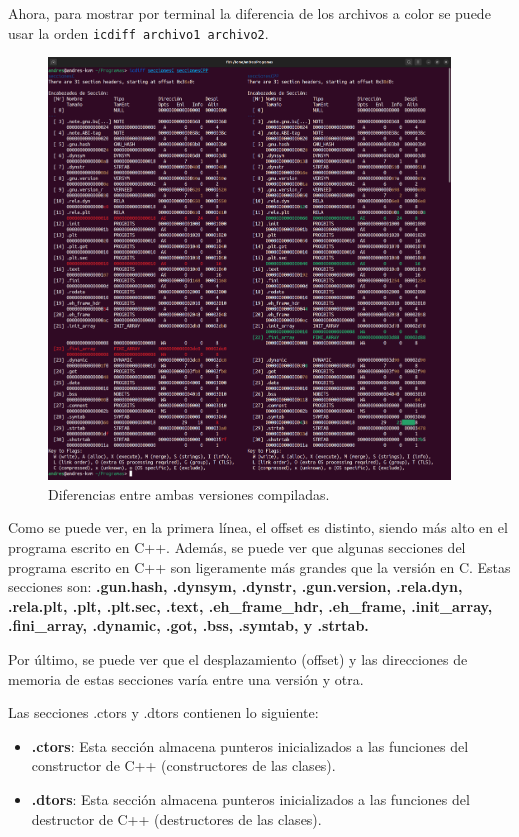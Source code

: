 \documentclass{article}
\begin{document}
Ahora, para mostrar por terminal la diferencia de los archivos a color se puede usar la orden \verb|icdiff archivo1 archivo2|.

\begin{figure}[H]
    \centering
    \includegraphics[width=0.95\textwidth]{imagenes/icdiff/mergedicdiff.png}
    \caption{Diferencias entre ambas versiones compiladas.}
\end{figure}

Como se puede ver, en la primera línea, el offset es distinto, siendo más alto en el programa escrito en C++. Además, se puede ver que algunas secciones del programa escrito en C++ son ligeramente más grandes que la versión en C. Estas secciones son: \textbf{.gun.hash, .dynsym, .dynstr, .gun.version, .rela.dyn, .rela.plt, .plt, .plt.sec, .text, .eh\_frame\_hdr, .eh\_frame, .init\_array, .fini\_array, .dynamic, .got, .bss, .symtab, y .strtab.}

\bigskip

Por último, se puede ver que el desplazamiento (offset) y las direcciones de memoria de estas secciones varía entre una versión y otra.


\bigskip

Las secciones .ctors y .dtors contienen lo siguiente:

\begin{itemize}
    \item \textbf{.ctors}: Esta sección almacena punteros inicializados a las funciones del constructor de C++ (constructores de las clases).
    \item \textbf{.dtors}: Esta sección almacena punteros inicializados a las funciones del destructor de C++ (destructores de las clases).
\end{itemize}
\end{document}
